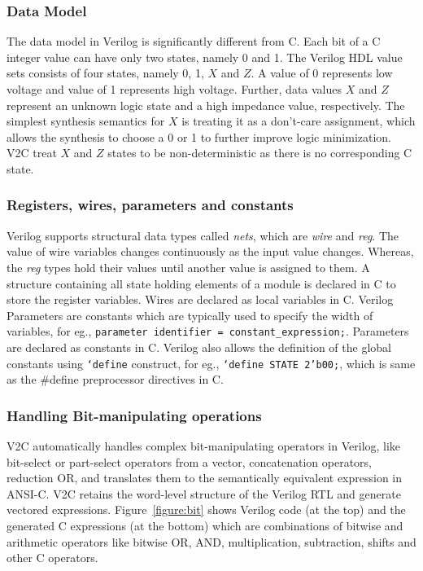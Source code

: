 \subsubsection{Data Model} The data model in Verilog is significantly 
different from C.  Each bit of a C integer value can have 
only two states, namely 0 and 1.  The Verilog HDL
value sets consists of four states, namely 0, 1, $X$ and $Z$.  A value of 0
represents low voltage and value of 1 represents high voltage.  Further,
data values $X$ and $Z$ represent an unknown logic state and a 
high impedance value, respectively.  The simplest synthesis semantics 
for $X$ is treating it as a don't-care assignment, which allows the 
synthesis to choose a 0 or 1 to further improve logic minimization.
V2C treat $X$ and $Z$ states to be non-deterministic as there is no
corresponding C state. 


\subsubsection{Registers, wires, parameters and constants} Verilog supports structural 
data types called \emph{nets}, which are \emph{wire}
and \emph{reg}. The value of wire variables changes 
continuously as the input value changes.  Whereas, 
the \emph{reg} types hold their values until another value is 
assigned to them.  A structure containing all state holding
elements of a module is declared in C to store the register
variables. Wires are declared as local variables in C.  
Verilog Parameters are constants which 
are typically used to specify the width of variables,
for eg., \texttt{parameter identifier = constant\_expression;}.
Parameters are declared as constants in C.  
Verilog also allows the definition of the global constants 
using \texttt{`define} construct, for eg., \texttt{`define STATE 2'b00;},
which is same as the \#define preprocessor directives in C.

\subsubsection{Handling Bit-manipulating operations}
V2C automatically handles complex bit-manipulating operators in Verilog, 
like bit-select or part-select operators from a vector,
concatenation operators, reduction OR, and translates them to the 
semantically equivalent expression in ANSI-C. V2C retains 
the word-level structure of the Verilog RTL and generate 
vectored expressions. Figure~\ref{figure:bit} shows 
Verilog code (at the top) and the generated C expressions 
(at the bottom) which are combinations of bitwise and 
arithmetic operators like bitwise OR, AND, multiplication, 
subtraction, shifts and other C operators.     

